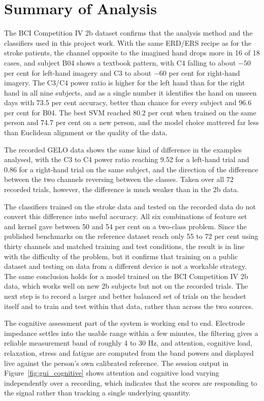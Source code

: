 \section{Summary of Analysis}

The BCI Competition IV 2b dataset confirms that the analysis method and the classifiers
used in this project work. With the same ERD/ERS recipe as for the stroke patients, the
channel opposite to the imagined hand drops more in 16 of 18 cases, and subject B04 shows a
textbook pattern, with C4 falling to about $-50$ per cent for left-hand imagery and C3 to
about $-60$ per cent for right-hand imagery. The C3/C4 power ratio is higher for the left
hand than for the right hand in all nine subjects, and as a single number it identifies
the hand on unseen days with 73.5 per cent accuracy, better than chance for every subject
and 96.6 per cent for B04. The best SVM reached 80.2 per cent when trained on the same
person and 74.7 per cent on a new person, and the model choice mattered far less than
Euclidean alignment or the quality of the data.

The recorded GELO data shows the same kind of difference in the examples analysed, with
the C3 to C4 power ratio reaching 9.52 for a left-hand trial and 0.86 for a right-hand
trial on the same subject, and the direction of the difference between the two channels
reversing between the classes. Taken over all 72 recorded trials, however, the difference
is much weaker than in the 2b data.

The classifiers trained on the stroke data and tested on the recorded data do not convert
this difference into useful accuracy. All six
combinations of feature set and kernel gave between 50 and 54 per cent on a two-class
problem. Since the published benchmarks on the reference dataset reach only 55 to 72 per
cent using thirty channels and matched training and test conditions, the result is in line
with the difficulty of the problem, but it confirms that training on a public dataset and
testing on data from a different device is not a workable strategy. The same conclusion
holds for a model trained on the BCI Competition IV 2b data, which works well on new 2b
subjects but not on the recorded trials. The next step is to
record a larger and better balanced set of trials on the headset itself and to train and
test within that data, rather than across the two sources.

The cognitive assessment part of the system is working end to end. Electrode impedance
settles into the usable range within a few minutes, the filtering gives a reliable
measurement band of roughly 4 to 30 Hz, and attention, cognitive load, relaxation, stress
and fatigue are computed from the band powers and displayed live against the person's own
calibrated reference. The session output in Figure~\ref{fig:gui_cognitive} shows attention
and cognitive load varying independently over a recording, which indicates that the scores
are responding to the signal rather than tracking a single underlying quantity.

